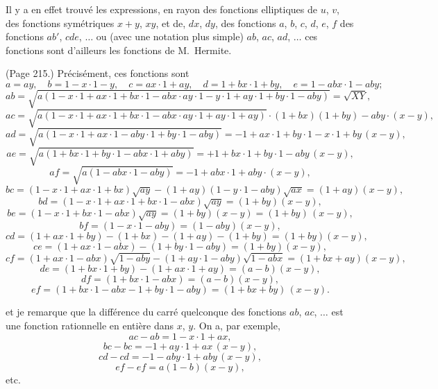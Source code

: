 \documentclass[11pt,a4paper]{article}
\theoremstyle{plain}
\theoremstyle{definition}
\begin{document}
Il y a en effet trouv\'e les expressions, en rayon des fonctions elliptiques de $u$, $v$, des fonctions sym\'etriques $x + y$, $xy$, et de, $dx$, $dy$, des fonctions $a$, $b$, $c$, $d$, $e$, $f$ des fonctions $ab'$, $cde$, $\ldots$ ou (avec une notation plus simple) $ab$, $ac$, $ad$, $\ldots$ ces fonctions sont d'ailleurs les fonctions de M.~Hermite.

\medskip

\noindent (Page 215.) Pr\'ecis\'ement, ces fonctions sont
\[
a = a y, \quad b = 1 - x \cdot 1 - y, \quad c = ax\cdot 1 + ay, \quad d = 1 + bx\cdot 1 + by, \quad e = 1 - abx\cdot 1 - aby;
\]
\[
ab = \sqrt{a(1 - x\cdot 1 + ax\cdot 1 + bx\cdot 1 - abx\cdot ay\cdot 1 - y\cdot 1 + ay\cdot 1 + by\cdot 1 - aby)} = \sqrt{XY},
\]
\[
ac = \sqrt{a(1 - x\cdot 1 + ax\cdot 1 + bx\cdot 1 - abx\cdot ay\cdot 1 + ay\cdot 1 + ay)} \cdot (1 + bx) (1 + by) - aby \cdot (x - y),
\]
\[
ad = \sqrt{a(1 - x\cdot 1 + ax\cdot 1 - aby\cdot 1 + by\cdot 1 - aby)} = -1 + a x\cdot 1 + by\cdot 1 - x \cdot 1 + by\,(x - y),
\]
\[
ae = \sqrt{a(1 + bx\cdot 1 + by\cdot 1 - abx\cdot 1 + aby)} = + 1 + bx\cdot 1 + by\cdot 1 - aby\,(x - y),
\]
\[
af = \sqrt{a(1 - abx\cdot 1 - aby)} = - 1 + abx \cdot 1 + aby \cdot (x - y),
\]
\[
bc = (1 - x\cdot 1 + ax\cdot 1 + bx)\sqrt{ay} - (1 + ay)(1 - y\cdot 1 - aby)\sqrt{ax} = (1 + ay)(x - y),
\]
\[
bd = (1 - x\cdot 1 + ax\cdot 1 + bx\cdot 1 - abx)\sqrt{ay} = (1 + by)(x - y),
\]
\[
be = (1 - x\cdot 1 + bx\cdot 1 - abx)\sqrt{ay} = (1 + by) (x - y) = (1 + by)\,(x - y),
\]
\[
bf = (1 - x\cdot 1 - aby) = (1 - aby)(x - y),
\]
\[
cd = (1 + ax\cdot 1 + by) - (1 + bx) - (1 + ay) - (1 + by) = (1 + by)(x - y),
\]
\[
ce = (1 + ax\cdot 1 - abx) - (1 + by\cdot 1 - aby) = (1 + by)(x - y),
\]
\[
cf = (1 + ax\cdot 1 - abx)\sqrt{1 - aby} - (1 + ay\cdot 1 - aby)\sqrt{1 - abx} = (1 + bx + ay)(x - y),
\]
\[
de = (1 + bx\cdot 1 + by) - (1 + ax\cdot 1 + ay) = (a - b)(x - y),
\]
\[
df = (1 + bx\cdot 1 - abx) = (a - b)(x - y),
\]
\[
ef = (1 + bx\cdot 1 - abx - 1 + by\cdot 1 - aby) = (1 + bx + by)\,(x - y).
\]

et je remarque que la diff\'erence du carr\'e quelconque des fonctions $ab$, $ac$, $\ldots$ est une fonction rationnelle en enti\`ere dans $x$, $y$. On a, par exemple,
\[
ac - ab = 1 - x\cdot 1 + ax,
\]
\[
bc - bc = - 1 + ay\cdot 1 + ax\,(x - y),
\]
\[
cd - cd = - 1 - aby\cdot 1 + aby\,(x - y),
\]
\[
ef - ef = a (1 - b)(x - y),
\]
etc.
\end{document}
